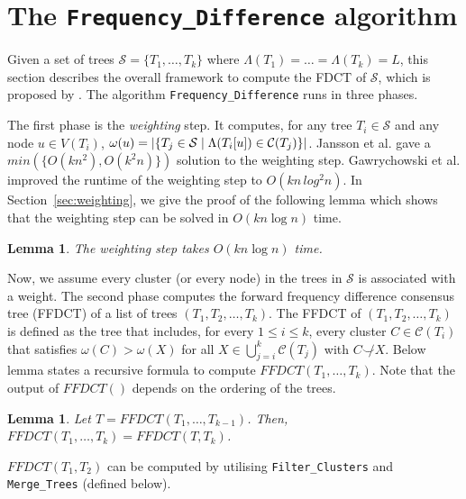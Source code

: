 \documentclass[final,1p,times]{elsarticle}
\newcommand{\compatible}{\smile}
\newcommand{\weight}{\omega}
\newtheorem{lemma}[theorem]{Lemma}
\begin{document}
    \section{The \texttt{Frequency\_Difference} algorithm}
    \label{sec_freq_diff_algo}

    Given a set of trees $\mathcal{S} = \{ T_1, \ldots, T_k \}$ where $\Lambda(T_1) = \ldots = \Lambda(T_k) = L$, this section describes the overall framework to compute the FDCT of $\mathcal{S}$, which is proposed by \cite{jansson2018algorithms}.
    The algorithm \texttt{Frequency\_Difference} runs in three phases.

    The first phase is the \textit{weighting} step. It computes, for any tree $T_i \in \mathcal{S}$ and any node $u \in V(T_i)$, $\weight(u) = | \{ T_j \in {\cal S} \mid \Lambda(T_i[u]) \in \mathcal{C}(T_j) \} |$. Jansson et al. \cite{jansson2018algorithms} gave a $min(\{O(kn^2), O(k^2n)\})$ solution to the weighting step.
    Gawrychowski et al. \cite{gawrychowski2017faster} improved the runtime of the weighting step to $O(kn\,log^2n)$. In Section~\ref{sec:weighting}, we give the proof of the following lemma which shows that the weighting step can be solved in $O(k n \log n)$ time.

    \begin{lemma}
	    \label{lem-weighting-time}
	   The weighting step takes $O(kn \log n)$ time.
    \end{lemma}

    Now, we assume every cluster (or every node) in the trees in $\mathcal{S}$ is associated with a weight. The second phase computes the forward frequency difference consensus tree (FFDCT) of a list of trees $(T_1, T_2, \ldots, T_k)$.
    The FFDCT of $(T_1, T_2, \ldots, T_k)$ is defined as the tree that includes, for every $1 \leq i \leq k$, every cluster $C \in \mathcal{C}(T_i)$ that satisfies $\weight(C) > \weight(X)$ for all $X \in \bigcup_{j=i}^k \mathcal{C}(T_j)$ with $C \not\compatible X$. Below lemma states a recursive formula to compute $FFDCT(T_1, \ldots, T_k)$. Note that the output of $FFDCT()$ depends on the ordering of the trees.

    \begin{lemma} \label{lem-FFDCT}
	    Let $T = FFDCT(T_1, \ldots, T_{k-1})$. Then, $FFDCT(T_1, \ldots, T_k) = FFDCT(T, T_k)$.
    \end{lemma}


    $FFDCT(T_1, T_2)$ can be computed by utilising \texttt{Filter\_Clusters} and \texttt{Merge\_Trees} (defined below).
\end{document}
